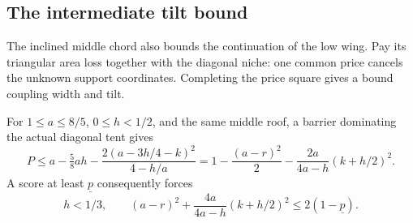 \subsection{The intermediate tilt bound}

The inclined middle chord also bounds the continuation of the low
wing. Pay its triangular area loss together with the diagonal niche:
one common price cancels the unknown support coordinates. Completing
the price square gives a bound coupling width and tilt.

\begin{lemma}\label{lem:preliminary-tilt}
For $1\le a\le8/5$, $0\le h<1/2$, and the same middle roof,
a barrier dominating the actual diagonal tent gives
\begin{equation}\label{eq:intermediate-tilt}
 P\le a-\tfrac58ah-\frac{2(a-3h/4-k)^2}{4-h/a}
  =1-\frac{(a-r)^2}{2}
       -\frac{2a}{4a-h}(k+h/2)^2.
\end{equation}
A score at least $\underline p$ consequently forces
\[
 h<1/3,\qquad (a-r)^2+\frac{4a}{4a-h}(k+h/2)^2
 \le2(1-\underline p).
\]
\end{lemma}
